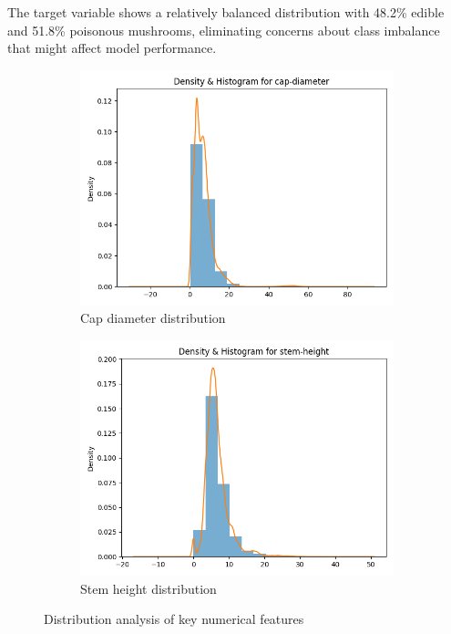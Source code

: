 \documentclass[11pt,a4paper]{article}
\begin{document}
The target variable shows a relatively balanced distribution with 48.2\% edible and 51.8\% poisonous mushrooms, eliminating concerns about class imbalance that might affect model performance.

\begin{figure}[H]
    \centering
    \begin{subfigure}{0.48\textwidth}
        \includegraphics[width=\textwidth]{figures/eda_dist_cap-diameter.png}
        \caption{Cap diameter distribution}
    \end{subfigure}
    \hfill
    \begin{subfigure}{0.48\textwidth}
        \includegraphics[width=\textwidth]{figures/eda_dist_stem-height.png}
        \caption{Stem height distribution}
    \end{subfigure}
    \caption{Distribution analysis of key numerical features}
    \label{fig:numerical_distributions}
\end{figure}
\end{document}

